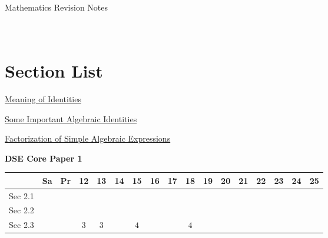 \documentclass[12pt, a4paper]{article}
\begin{document}
\newpage
\newpage
\thispagestyle{empty}
\begin{center}
Mathematics Revision Notes\\\vspace{1cm}
\\\vspace{1cm}
{\fontsize{24pt}{24pt}\selectfont {Identities and Factorization}} \\\vspace{1cm}
\label{chapter:S2-2}

\end{center}
\vspace{0.5cm}
\hline
\section*{Section List}
\begin{enumx}[label=Sec 2.\arabic*\ ]
\item \hyperref[section:2-2-1]{Meaning of Identities}
\item \hyperref[section:2-2-2]{Some Important Algebraic Identities}
\item \hyperref[section:2-2-3]{Factorization of Simple Algebraic Expressions}
\end{enumx}
\begin{absolutelynopagebreak}
\begin{center}
\textbf{DSE Core Paper 1}
\end{center}
\begin{center}
\begin{tabular}{|l|c|c|c|c|c|c|c|c|c|c|c|c|c|c|c|c|}
\hline
        & Sa & Pr & 12 & 13 & 14 & 15 & 16 & 17 & 18 & 19 & 20 & 21 & 22 & 23 & 24 & 25 \\\hline\hline
Sec 2.1 &  &  &  &  &  &  &  &  &  &  &  &  &  &  &  &  \\\hline
Sec 2.2 &  &  &  &  &  &  &  &  &  &  &  &  &  &  &  &  \\\hline
Sec 2.3 &  &  &  $3$ &  $3$ &  &  $4$ &  &  &  $4$ &  &  &  &  &  &  &  \\\hline
\end{tabular}
\end{center}
\end{absolutelynopagebreak}
\end{document}
